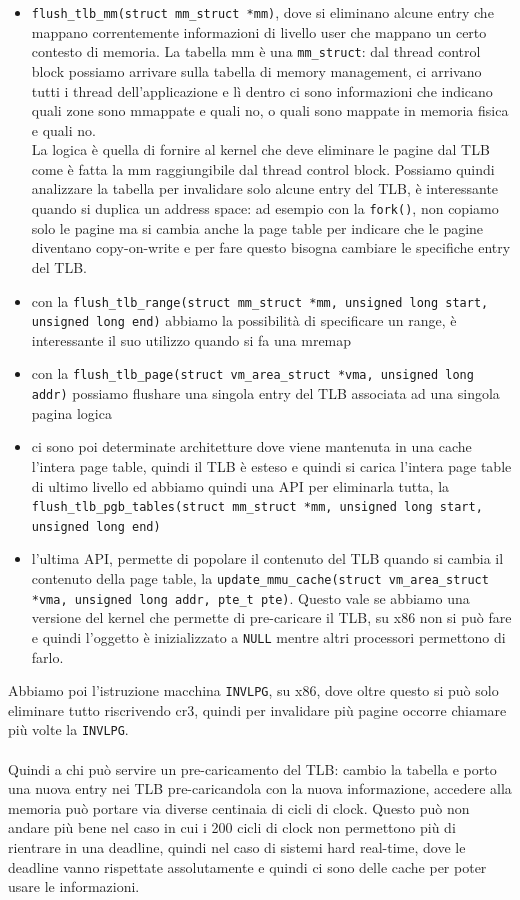 \documentclass[12pt, oneside]{extbook}
\begin{document}
\begin{itemize}
	\item \texttt{flush\_tlb\_mm(struct mm\_struct *mm)}, dove si eliminano alcune entry che mappano correntemente informazioni di livello user che mappano un certo contesto di memoria. La tabella mm è una \texttt{mm\_struct}: dal thread control block possiamo arrivare sulla tabella di memory management, ci arrivano tutti i thread dell'applicazione e lì dentro ci sono informazioni che indicano quali zone sono mmappate e quali no, o quali sono mappate in memoria fisica e quali no.\\La logica è quella di fornire al kernel che deve eliminare le pagine dal TLB come è fatta la mm raggiungibile dal thread control block. Possiamo quindi analizzare la tabella per invalidare solo alcune entry del TLB, è interessante quando si duplica un address space: ad esempio con la \texttt{fork()}, non copiamo solo le pagine ma si cambia anche la page table per indicare che le pagine diventano copy-on-write e per fare questo bisogna cambiare le specifiche entry del TLB. 
	\item con la \texttt{flush\_tlb\_range(struct mm\_struct *mm, unsigned long start, unsigned long end)} abbiamo la possibilità di specificare un range, è interessante il suo utilizzo quando si fa una mremap
	\item con la \texttt{flush\_tlb\_page(struct vm\_area\_struct *vma, unsigned long addr)} possiamo flushare una singola entry del TLB associata ad una singola pagina logica
	\item ci sono poi determinate architetture dove viene mantenuta in una cache l'intera page table, quindi il TLB è esteso e quindi si carica l'intera page table di ultimo livello ed abbiamo quindi una API per eliminarla tutta, la \texttt{flush\_tlb\_pgb\_tables(struct mm\_struct *mm, unsigned long start, unsigned long end)}
	\item l'ultima API, permette di popolare il contenuto del TLB quando si cambia il contenuto della page table, la \texttt{update\_mmu\_cache(struct vm\_area\_struct *vma, unsigned long addr, pte\_t pte)}. Questo vale se abbiamo una versione del kernel che permette di pre-caricare il TLB, su x86 non si può fare e quindi l'oggetto è inizializzato a \texttt{NULL} mentre altri processori permettono di farlo.
\end{itemize}
Abbiamo poi l'istruzione macchina \texttt{INVLPG}, su x86, dove oltre questo si può solo eliminare tutto riscrivendo cr3, quindi per invalidare più pagine occorre chiamare più volte la \texttt{INVLPG}.\\\\Quindi a chi può servire un pre-caricamento del TLB: cambio la tabella e porto una nuova entry nei TLB pre-caricandola con la nuova informazione, accedere alla memoria può portare via diverse centinaia di cicli di clock. Questo può non andare più bene nel caso in cui i 200 cicli di clock non permettono più di rientrare in una deadline, quindi nel caso di sistemi hard real-time, dove le deadline vanno rispettate assolutamente e quindi ci sono delle cache per poter usare le informazioni.
\end{document}
